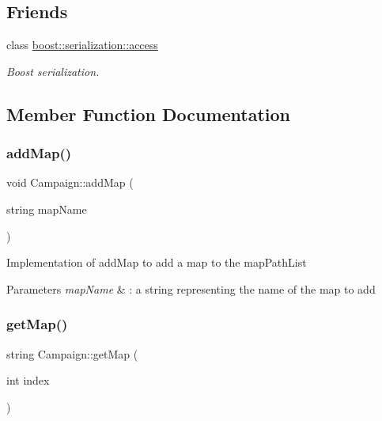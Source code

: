 \subsection*{Friends}
\begin{DoxyCompactItemize}
\item 
\hypertarget{class_campaign_ac98d07dd8f7b70e16ccb9a01abf56b9c}{}\label{class_campaign_ac98d07dd8f7b70e16ccb9a01abf56b9c} 
class \hyperlink{class_campaign_ac98d07dd8f7b70e16ccb9a01abf56b9c}{boost\+::serialization\+::access}
\begin{DoxyCompactList}\small\item\em Boost serialization. \end{DoxyCompactList}\end{DoxyCompactItemize}


\subsection{Member Function Documentation}
\hypertarget{class_campaign_a51ee2b7f2cb73b5e2ed75577d8d36ee2}{}\label{class_campaign_a51ee2b7f2cb73b5e2ed75577d8d36ee2} 
\subsubsection{\texorpdfstring{add\+Map()}{addMap()}}
{\footnotesize\ttfamily void Campaign\+::add\+Map (\begin{DoxyParamCaption}\item[{string}]{map\+Name }\end{DoxyParamCaption})}

Implementation of add\+Map to add a map to the map\+Path\+List 
\begin{DoxyParams}{Parameters}
{\em map\+Name} & \+: a string representing the name of the map to add \\
\hline
\end{DoxyParams}
\hypertarget{class_campaign_a1502a3bc96675f347158932960bbbb27}{}\label{class_campaign_a1502a3bc96675f347158932960bbbb27} 
\subsubsection{\texorpdfstring{get\+Map()}{getMap()}}
{\footnotesize\ttfamily string Campaign\+::get\+Map (\begin{DoxyParamCaption}\item[{int}]{index }\end{DoxyParamCaption})}


